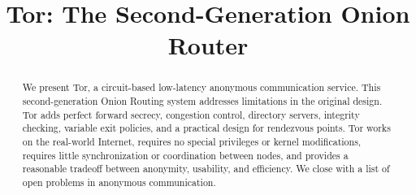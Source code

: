 \documentclass[times,10pt,twocolumn]{article}
\begin{document}

\title{Tor: The Second-Generation Onion Router}


\maketitle
\thispagestyle{empty}

\begin{abstract}
We present Tor, a circuit-based low-latency anonymous communication
service. This second-generation Onion Routing system addresses limitations
in the original design. Tor adds perfect forward secrecy, congestion
control, directory servers, integrity checking, variable exit policies,
and a practical design for rendezvous points. Tor works on the real-world
Internet, requires no special privileges or kernel modifications, requires
little synchronization or coordination between nodes, and provides a
reasonable tradeoff between anonymity, usability, and efficiency. We
close with a list of open problems in anonymous communication.
\end{abstract}



\label{sec:intro}
\end{document}
